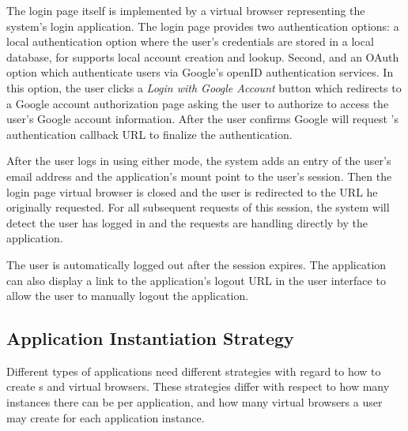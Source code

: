 The login page itself is implemented by a virtual
browser representing the system's login application. The login page provides two
authentication options: a local authentication option where the user's
credentials are stored in a local database, for \cb supports local account creation and lookup.
Second, and an OAuth~\cite{hardt2012oauth} option which
authenticate users via Google's openID authentication services. 
In this option, the user clicks a \emph{Login with Google Account} button which redirects
to a Google account authorization page asking the user to authorize \cb{} to access
the user's Google account information.
After the user confirms Google will request \cb{}'s authentication
callback URL to finalize the authentication.

After the user logs in using either mode, the system adds an entry of the
user's email address and the application's mount point to the user's session.
Then the login page virtual browser is closed and the user is
redirected to the URL he originally requested. 
For all subsequent requests of this session, the system will detect the user has 
logged in and the requests are handling directly by the application.

The user is automatically logged out after the session expires.
The application can also display a link to the application's logout URL 
in the user interface to allow the user to manually logout the application.

\subsection{Application Instantiation Strategy}
\label{sec:appinstantiation}

Different types of applications need different strategies with regard to how to 
create \appins{}s and virtual browsers.
These strategies differ with respect to how many instances there can be
per application, and how many virtual browsers a user may create for each
application instance.


